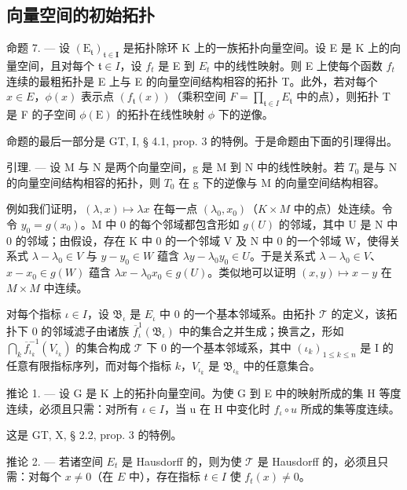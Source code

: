 \subsection{向量空间的初始拓扑}

命题 7. --- 设 \((\mathrm{E}_{\mathfrak{t}})_{\mathfrak{t}\in\mathbf{I}}\) 是拓扑除环 K 上的一族拓扑向量空间。设 E 是 K 上的向量空间，且对每个 \(\mathfrak{t}\in I\)，设 \(f_{t}\) 是 E 到 \(E_{t}\) 中的线性映射。则 E 上使每个函数 \(f_{t}\) 连续的最粗拓扑是 E 上与 E 的向量空间结构相容的拓扑 T。此外，若对每个 \(x\in E\)，\(\phi(x)\) 表示点 \((f_{\mathfrak{t}}(x))\)（乘积空间 \(F=\prod_{\mathfrak{t}\in I}E_{\mathfrak{t}}\) 中的点），则拓扑 T 是 F 的子空间 \(\phi(\mathrm{E})\) 的拓扑在线性映射 \(\phi\) 下的逆像。

命题的最后一部分是 GT, I, § 4.1, prop. 3 的特例。于是命题由下面的引理得出。

引理. --- 设 M 与 N 是两个向量空间，g 是 M 到 N 中的线性映射。若 \(T_{0}\) 是与 N 的向量空间结构相容的拓扑，则 \(T_{0}\) 在 g 下的逆像与 M 的向量空间结构相容。

例如我们证明，\((\lambda, x) \mapsto \lambda x\) 在每一点 \((\lambda_{0}, x_{0})\)（\(K \times M\) 中的点）处连续。令令 \(y_{0} = g(x_{0})\)。M 中 0 的每个邻域都包含形如 \(g(U)\) 的邻域，其中 U 是 N 中 0 的邻域；由假设，存在 K 中 0 的一个邻域 V 及 N 中 0 的一个邻域 W，使得关系式 \(\lambda - \lambda_{0} \in V\) 与 \(y - y_{0} \in W\) 蕴含 \(\lambda y - \lambda_{0}y_{0} \in U\)。于是关系式 \(\lambda - \lambda_{0} \in V\)、\(x - x_{0} \in g(W)\) 蕴含 \(\lambda x - \lambda_{0}x_{0} \in g(U)\)。类似地可以证明 \((x, y) \mapsto x - y\) 在 \(M \times M\) 中连续。

对每个指标 \(\iota \in I\)，设 \(\mathfrak{B}_{\iota}\) 是 \(E_{\iota}\) 中 0 的一个基本邻域系。由拓扑 \(\mathcal{T}\) 的定义，该拓扑下 0 的邻域滤子由诸族 \(\overline{f}_{\iota}^{1}(\mathfrak{B}_{\iota})\) 中的集合之并生成；换言之，形如 \(\bigcap_{k} \overline{f}_{\iota_k}^{-1}(V_{\iota_k})\) 的集合构成 \(\mathcal{T}\) 下 0 的一个基本邻域系，其中 \((\iota_k)_{1 \leqslant k \leqslant n}\) 是 I 的任意有限指标序列，而对每个指标 \(k\)，\(V_{\iota_k}\) 是 \(\mathfrak{B}_{\iota_k}\) 中的任意集合。

推论 1. --- 设 G 是 K 上的拓扑向量空间。为使 G 到 E 中的映射所成的集 H 等度连续，必须且只需：对所有 \(\iota \in I\)，当 u 在 H 中变化时 \(f_{\iota} \circ u\) 所成的集等度连续。

这是 GT, X, § 2.2, prop. 3 的特例。

推论 2. --- 若诸空间 \(E_{t}\) 是 Hausdorff 的，则为使 \(\mathcal{T}\) 是 Hausdorff 的，必须且只需：对每个 \(x \neq 0\)（在 \(E\) 中），存在指标 \(t \in I\) 使 \(f_{t}(x) \neq 0\)。


